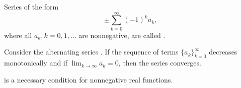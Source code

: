 \begin{definition}\label{def:alternating_series}
  Series of the form
  \begin{equation}\label{def:alternating_series/series}
    \pm \sum_{k=0}^\infty (-1)^k a_k,
  \end{equation}
  where all \( a_k, k = 0, 1, \ldots \) are nonnegative, are called .
\end{definition}

\begin{proposition}\label{leibniz_alternating_series_test}
  Consider the alternating series . If the sequence of terms \( \{ a_k \}_{k=0}^\infty \) decreases monotonically and if \( \lim_{k \to \infty} a_k = 0 \), then the series converges.
\end{proposition}

\begin{theorem}\label{thm:weierstrass_series_criterion_nessessity}
   is a necessary condition for nonnegative real functions.
\end{theorem}

